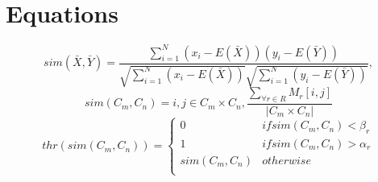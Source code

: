 \documentclass[12pt]{ucthesis}
\begin{document}
   \section{Equations}\label{sec:equations}
      \begin{equation}\label{eq:pearson}
         sim(\bar{X},\bar{Y}) = \frac{\sum_{i=1}^{N}(x_i - E(\bar{X}))(y_i - E(\bar{Y}))}
         {\sqrt{\sum_{i=1}^{N}(x_i-E(\bar{X}))}\sqrt{\sum_{i=1}^{N}(y_i-E(\bar{Y}))}},
      \end{equation}
      \begin{equation}\label{eq:cluster_sim}
         sim(C_m, C_n) = i,j \in C_m \times C_n, \frac{\sum_{\forall r \in
         R}M_r[i,j]} {|C_m \times C_n|}
      \end{equation}
      \begin{equation}\label{eq:threshold}
         thr(sim(C_m, C_n)) = \begin{cases}
                              0 & if sim(C_m, C_n) < \beta_r \\
                              1 & if sim(C_m, C_n) > \alpha_r \\
                              sim(C_m, C_n) & otherwise \\
                              \end{cases}
      \end{equation}

\clearpage


\end{document}
